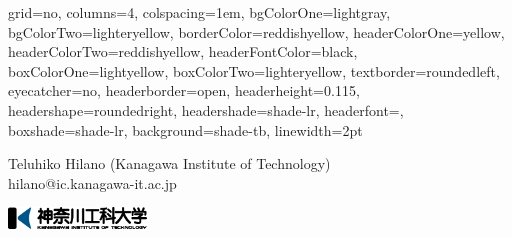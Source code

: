 \documentclass[portrait,final,a0paper]{baposter}
\begin{document}
\fi
\iffalse\else
{}
\fi
\newlength{\leftimgwidth}
\begin{poster}%
  {
  grid=no,
  columns=4,
  colspacing=1em,
  bgColorOne=lightgray,
  bgColorTwo=lighteryellow,
  borderColor=reddishyellow,
  headerColorOne=yellow,
  headerColorTwo=reddishyellow,
  headerFontColor=black,
  boxColorOne=lightyellow,
  boxColorTwo=lighteryellow,
  textborder=roundedleft,
  eyecatcher=no,
  headerborder=open,
  headerheight=0.115\textheight,
  headershape=roundedright,
  headershade=shade-lr,%
  headerfont=\Large\textsf, %
  boxshade=shade-lr,%
%
  background=shade-tb,
  linewidth=2pt
  }
  {%
 }
  {%
\bf%
 \vspace*{2em}
 \Huge
 \hspace*{1em}\protect{}\\
 \hspace*{2em}\protect{}
\vspace{-0.6em}
 }
  {\sf %
\begin{center}
\begin{minipage}[b][0em]{5em}
\raisebox{-3\baselineskip}%
{}\end{minipage}
\begin{minipage}[t]{0.8\textwidth}
\begin{center}
\hspace*{2em}Teluhiko Hilano
(Kanagawa Institute of Technology)\\
 hilano@ic.kanagawa-it.ac.jp
\end{center}
\end{minipage}
\end{center}
  }
  {%
\includegraphics[width=10em]{./kait-logo.png}
    }
  

\end{poster}
\end{document}
